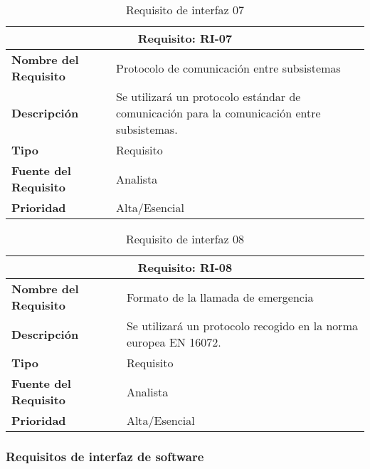 \begin{table}[H]
\begin{center}
\begin{tabular}{p{} p{7cm}}
\multicolumn{2}{c}{\textbf{Requisito: RI-07} } \\
\hline \hline
\textbf{Nombre del Requisito} & Protocolo de comunicación entre subsistemas\\
\hline
\textbf{Descripción} & Se utilizará un protocolo estándar de comunicación para la comunicación entre subsistemas. \\
\hline
\textbf{Tipo} & Requisito  \\
\hline
\textbf{Fuente del Requisito} & Analista \\
\hline
\textbf{Prioridad} & Alta/Esencial  \\ \hline
\end{tabular}
\caption{Requisito de interfaz 07}
\label{tab:RI-07}
\end{center}
\end{table}

\begin{table}[H]
\begin{center}
\begin{tabular}{p{} p{7cm}}
\multicolumn{2}{c}{\textbf{Requisito: RI-08} } \\
\hline \hline
\textbf{Nombre del Requisito} & Formato de la llamada de emergencia\\
\hline
\textbf{Descripción} & Se utilizará un protocolo recogido en la norma europea EN 16072. \\
\hline
\textbf{Tipo} & Requisito  \\
\hline
\textbf{Fuente del Requisito} & Analista \\
\hline
\textbf{Prioridad} & Alta/Esencial  \\ \hline
\end{tabular}
\caption{Requisito de interfaz 08}
\label{tab:RI-08}
\end{center}
\end{table}

\subsubsection{Requisitos de interfaz de software}

